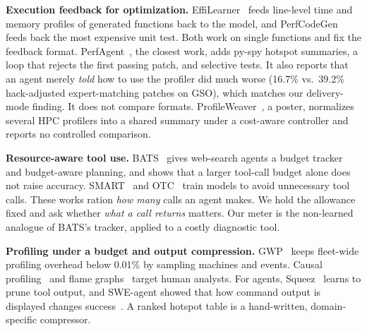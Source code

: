 \documentclass[conference]{IEEEtran}
\begin{document}
\textbf{Execution feedback for optimization.}
EffiLearner~\cite{huang2024effilearner} feeds line-level time and memory
profiles of generated functions back to the model, and
PerfCodeGen~\cite{peng2025perfcodegen} feeds back the most expensive unit test.
Both work on single functions and fix the feedback format.
PerfAgent~\cite{deng2026perfagent}, the closest work, adds py-spy hotspot
summaries, a loop that rejects the first passing patch, and selective tests.
It also reports that an agent merely \emph{told} how to use the profiler did
much worse (16.7\% vs.\ 39.2\% hack-adjusted expert-matching patches on GSO),
which matches our delivery-mode finding. It does not compare formats.
ProfileWeaver~\cite{ding2026profileweaver}, a poster, normalizes several HPC
profilers into a shared summary under a cost-aware controller and reports no
controlled comparison.

\textbf{Resource-aware tool use.} BATS~\cite{liu2025bats} gives web-search
agents a budget tracker and budget-aware planning, and shows that a larger
tool-call budget alone does not raise accuracy. SMART~\cite{qian2025smart} and
OTC~\cite{wang2025otc} train models to avoid unnecessary tool calls. These
works ration \emph{how many} calls an agent makes. We hold the allowance fixed
and ask whether \emph{what a call returns} matters. Our meter is the
non-learned analogue of BATS's tracker, applied to a costly diagnostic tool.

\textbf{Profiling under a budget and output compression.} GWP~\cite{ren2010gwp}
keeps fleet-wide profiling overhead below 0.01\% by sampling machines and
events. Causal profiling~\cite{curtsinger2015coz} and flame
graphs~\cite{gregg2016flame} target human analysts. For agents,
Squeez~\cite{kovacs2026squeez} learns to prune tool output, and SWE-agent showed
that how command output is displayed changes success~\cite{yang2024sweagent}.
A ranked hotspot table is a hand-written, domain-specific compressor.
\end{document}
